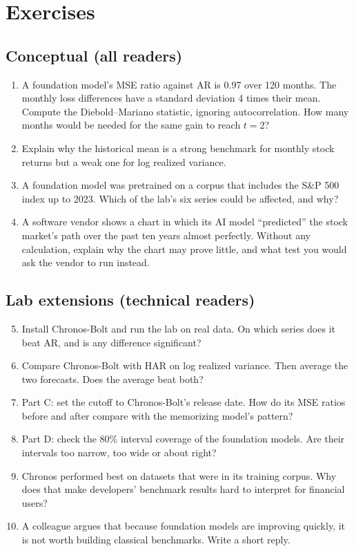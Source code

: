 \section*{Exercises}

\subsection*{Conceptual (all readers)}

\begin{enumerate}
  \item A foundation model's MSE ratio against AR is 0.97 over 120 months. The monthly loss differences have a standard deviation 4 times their mean. Compute the Diebold--Mariano statistic, ignoring autocorrelation. How many months would be needed for the same gain to reach $t = 2$?
  \item Explain why the historical mean is a strong benchmark for monthly stock returns but a weak one for log realized variance.
  \item A foundation model was pretrained on a corpus that includes the S\&P 500 index up to 2023. Which of the lab's six series could be affected, and why?
  \item A software vendor shows a chart in which its AI model ``predicted'' the stock market's path over the past ten years almost perfectly. Without any calculation, explain why the chart may prove little, and what test you would ask the vendor to run instead.
\end{enumerate}

\subsection*{Lab extensions (technical readers)}

\begin{enumerate}
  \setcounter{enumi}{4}
  \item Install Chronos-Bolt and run the lab on real data. On which series does it beat AR, and is any difference significant?
  \item Compare Chronos-Bolt with HAR on log realized variance. Then average the two forecasts. Does the average beat both?
  \item Part C: set the cutoff to Chronos-Bolt's release date. How do its MSE ratios before and after compare with the memorizing model's pattern?
  \item Part D: check the 80\% interval coverage of the foundation models. Are their intervals too narrow, too wide or about right?
  \item Chronos performed best on datasets that were in its training corpus. Why does that make developers' benchmark results hard to interpret for financial users?
  \item A colleague argues that because foundation models are improving quickly, it is not worth building classical benchmarks. Write a short reply.
\end{enumerate}

